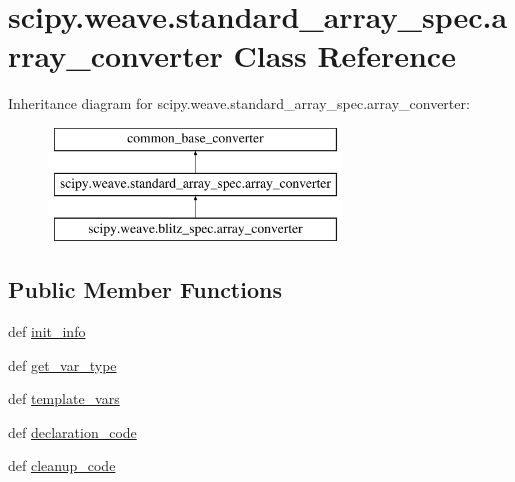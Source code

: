 \hypertarget{classscipy_1_1weave_1_1standard__array__spec_1_1array__converter}{}\section{scipy.\+weave.\+standard\+\_\+array\+\_\+spec.\+array\+\_\+converter Class Reference}
\label{classscipy_1_1weave_1_1standard__array__spec_1_1array__converter}
Inheritance diagram for scipy.\+weave.\+standard\+\_\+array\+\_\+spec.\+array\+\_\+converter\+:\begin{figure}[H]
\begin{center}
\leavevmode
\includegraphics[height=3.000000cm]{classscipy_1_1weave_1_1standard__array__spec_1_1array__converter}
\end{center}
\end{figure}
\subsection*{Public Member Functions}
\begin{DoxyCompactItemize}
\item 
def \hyperlink{classscipy_1_1weave_1_1standard__array__spec_1_1array__converter_ade7a7a2eb36f9fa99e77f858128cc939}{init\+\_\+info}
\item 
def \hyperlink{classscipy_1_1weave_1_1standard__array__spec_1_1array__converter_a1c55e0a5d0af6a653f1f1ffaddd7ee06}{get\+\_\+var\+\_\+type}
\item 
def \hyperlink{classscipy_1_1weave_1_1standard__array__spec_1_1array__converter_a789f0e3a11548375628d61a71ed04ee3}{template\+\_\+vars}
\item 
def \hyperlink{classscipy_1_1weave_1_1standard__array__spec_1_1array__converter_a48df1b51b689c5bb5b24fadac480be38}{declaration\+\_\+code}
\item 
def \hyperlink{classscipy_1_1weave_1_1standard__array__spec_1_1array__converter_a0b5e5212a62fbde56d11aa88de521ca6}{cleanup\+\_\+code}
\end{DoxyCompactItemize}
